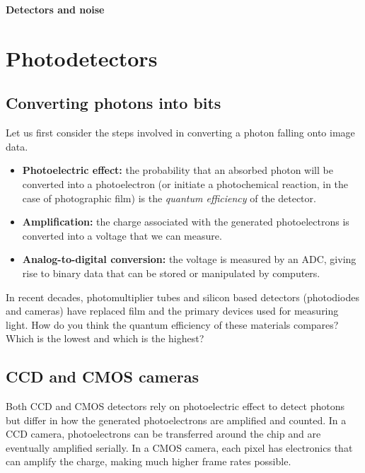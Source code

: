\documentclass[a4paper]{report}
\newcommand{\nexercise}[0]{\arabic{exercises}\addtocounter{exercises}{1}}
\begin{document}
\addtocounter{exercises}{1}

\begin{center}
\textbf{\Large{Detectors and noise}}
\end{center}
\section{Photodetectors}
\subsection{Converting photons into bits}
Let us first consider the steps involved in converting a photon falling onto image data. 
\begin{itemize}
	\item \textbf{Photoelectric effect:} the probability that an absorbed photon will be converted into a photoelectron (or initiate a photochemical reaction, in the case of photographic film) is the \textit{quantum efficiency} of the detector.
	\item \textbf{Amplification:} the charge associated with the generated photoelectrons is converted into a voltage that we can measure. 
	\item \textbf{Analog-to-digital conversion:} the voltage is measured by an ADC, giving rise to binary data that can be stored or manipulated by computers.
\end{itemize}

\begin{exercisebox}[frametitle={Exercise \nexercise: Quantum efficiency of different materials}]
In recent decades, photomultiplier tubes and silicon based detectors (photodiodes and cameras) have replaced film and the primary devices used for measuring light.
How do you think the quantum efficiency of these materials compares? 
Which is the lowest and which is the highest?
\end{exercisebox}

\subsection{CCD and CMOS cameras}
Both CCD and CMOS detectors rely on photoelectric effect to detect photons but differ in how the generated photoelectrons are amplified and counted. 
In a CCD camera, photoelectrons can be transferred around the chip and are eventually amplified serially. 
In a CMOS camera, each pixel has electronics that can amplify the charge, making much higher frame rates possible.
\end{document}
